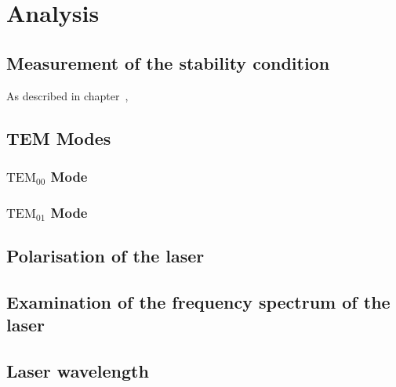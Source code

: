 \section{Analysis}
\subsection{Measurement of the stability condition}
As described in chapter~\cite{sec:theory},

\subsection{TEM Modes}
\subsubsection{\texorpdfstring{$\text{TEM}_{00}$}{TEM} Mode}
\subsubsection{\texorpdfstring{$\text{TEM}_{01}$}{TEM} Mode}
\subsection{Polarisation of the laser}
\subsection{Examination of the frequency spectrum of the laser}
\subsection{Laser wavelength}
